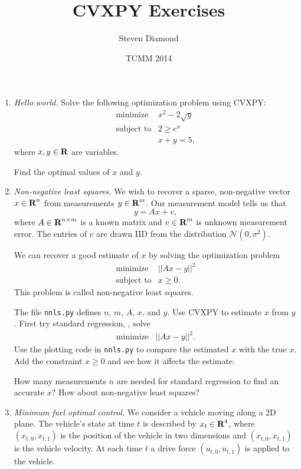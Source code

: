 \documentclass[12pt]{article}
\title{CVXPY Exercises}
\author{Steven Diamond}
\date{TCMM 2014}
\begin{document}
\maketitle

\begin{enumerate}
\item\emph{Hello world.}
Solve the following optimization problem using CVXPY:
\[
\begin{array}{ll} \mbox{minimize} & x^2 - 2\sqrt{y}\\
\mbox{subject to} & 2 \geq e^x \\
& x + y = 5,
\end{array}
\]
where $x,y \in {\mbox{\bf R}}$ are variables.

Find the optimal values of $x$ and $y$.

\item\emph{Non-negative least squares.}
We wish to recover a sparse, non-negative vector $x \in {\mbox{\bf R}}^n$ from measurements $y \in {\mbox{\bf R}}^m$. Our measurement model tells us that
$$
y = Ax + v,
$$
where $A \in {\mbox{\bf R}}^{n \times m}$ is a known matrix and $v \in {\mbox{\bf R}}^m$ is unknown measurement error. The entries of $v$ are drawn IID from the distribution $\mathcal{N}(0, \sigma^2)$.

We can recover a good estimate of $x$ by solving the optimization problem
\[
\begin{array}{ll} \mbox{minimize} & ||Ax - y||^2\\
\mbox{subject to} & x \geq 0.
\end{array}
\]
This problem is called non-negative least squares.

The file \verb+nnls.py+ defines $n$, $m$, $A$, $x$, and $y$. Use CVXPY to estimate $x$ from $y$. First try standard regression, \ie, solve
\[
\begin{array}{ll} \mbox{minimize} & ||Ax - y||^2.
\end{array}
\]
Use the plotting code in \verb+nnls.py+ to compare the estimated $x$ with the true $x$. Add the constraint $x \geq 0$ and see how it affects the estimate.

How many measurements $n$ are needed for standard regression to find an accurate $x$? How about non-negative least squares?

\item \emph{Minimum fuel optimal control.}
We consider a vehicle moving along a 2D plane. The vehicle's state at time $t$ is described by $x_t \in {\mbox{\bf R}}^4$, where $(x_{t,0}, x_{t,1})$ is the position of the vehicle in two dimensions and $(x_{t,0}, x_{t,1})$ is the vehicle velocity. At each time $t$ a drive force $(u_{t,0}, u_{t,1})$ is applied to the vehicle.


\end{enumerate}
\end{document}
